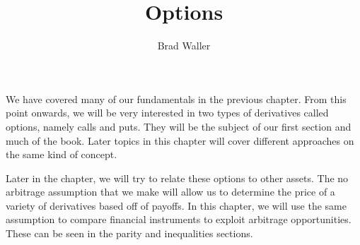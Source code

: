 \documentclass{ximera}
\title{Options}
\author{Brad Waller}
\begin{document}
\maketitle

We have covered many of our fundamentals in the previous chapter. From this point onwards, we will be very interested in two types of derivatives called options, namely calls and puts. They will be the subject of our first section and much of the book. Later topics in this chapter will cover different approaches on the same kind of concept.

Later in the chapter, we will try to relate these options to other assets. The no arbitrage assumption that we make will allow us to determine the price of a variety of derivatives based off of payoffs. In this chapter, we will use the same assumption to compare financial instruments to exploit arbitrage opportunities. These can be seen in the parity and inequalities sections. 
\end{document}
